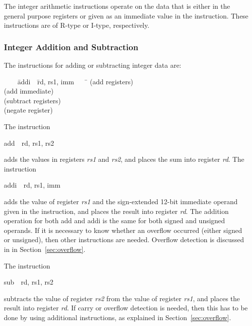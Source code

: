 \documentclass[11pt, twoside, pdftex]{article}
\newenvironment{ctabbing}%
{\begin{center}\begin{minipage}{\textwidth}\begin{tabbing}}
{\end{tabbing}\end{minipage}\end{center}}
\begin{document}
The integer arithmetic instructions operate on the data that is either in the general purpose 
registers or given as an immediate value in the instruction. These instructions are of 
R-type or I-type, respectively.

\subsubsection{Integer Addition and Subtraction}
\label{sec:addsub}

The instructions for adding or subtracting integer data are:
\vspace{-\baselineskip}
\begin{ctabbing}
~~~~\={\sf addi}~~\={\sf rd, rs1, imm}~~~~\=\kill
{}  \>(add registers)\\
  \>(add immediate)\\
  \>(subtract registers)\\
  \>(negate register)
\end{ctabbing}
\newpage
The instruction
\vspace{-\baselineskip}
\begin{center}
{\sf add~~rd, rs1, rs2}
\end{center}
\noindent
adds the values in registers {\it rs1} and {\it rs2}, and places the sum into register {\it rd}.
The instruction
\vspace{-\baselineskip}
\begin{center}
{\sf addi~~rd, rs1, imm}
\end{center}

\noindent
adds the value of register {\it rs1} and the sign-extended 12-bit immediate operand given 
in the instruction, and places the result into register {\it rd}.
The addition operation for both {\sf add} and {\sf addi} is the same for both signed and 
unsigned operands. If it is necessary to know whether an overflow occurred (either signed
or unsigned), then other instructions are needed. Overflow detection is discussed in 
in Section~\ref{sec:overflow}.

\noindent
The instruction
\vspace{-\baselineskip}
\begin{center}
{\sf sub~~rd, rs1, rs2}
\end{center}
\noindent
subtracts the value of register {\it rs2} from the value of register {\it rs1}, and places the 
result into register {\it rd}. If carry or overflow detection is needed, then this has to be 
done by using additional instructions, as explained in Section~\ref{sec:overflow}.
\end{document}
